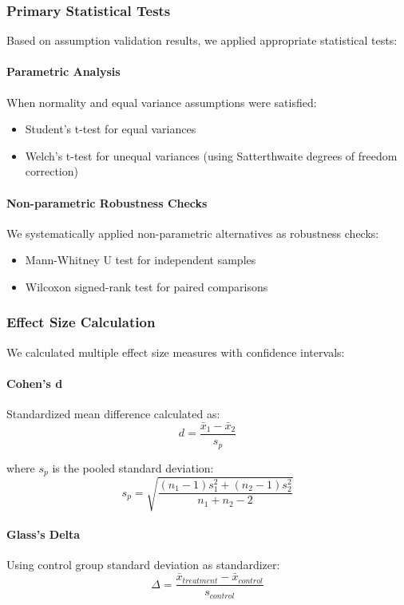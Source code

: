 \documentclass[conference]{IEEEtran}
\begin{document}
\subsubsection{Primary Statistical Tests}
Based on assumption validation results, we applied appropriate statistical tests:

\paragraph{Parametric Analysis}
When normality and equal variance assumptions were satisfied:
\begin{itemize}
    \item Student's t-test for equal variances
    \item Welch's t-test for unequal variances (using Satterthwaite degrees of freedom correction)
\end{itemize}

\paragraph{Non-parametric Robustness Checks}
We systematically applied non-parametric alternatives as robustness checks:
\begin{itemize}
    \item Mann-Whitney U test for independent samples
    \item Wilcoxon signed-rank test for paired comparisons
\end{itemize}

\subsubsection{Effect Size Calculation}
We calculated multiple effect size measures with confidence intervals:

\paragraph{Cohen's d}
Standardized mean difference calculated as:
\begin{equation}
d = \frac{\bar{x}_1 - \bar{x}_2}{s_p}
\end{equation}

where $s_p$ is the pooled standard deviation:
\begin{equation}
s_p = \sqrt{\frac{(n_1-1)s_1^2 + (n_2-1)s_2^2}{n_1 + n_2 - 2}}
\end{equation}

\paragraph{Glass's Delta}
Using control group standard deviation as standardizer:
\begin{equation}
\Delta = \frac{\bar{x}_{treatment} - \bar{x}_{control}}{s_{control}}
\end{equation}
\end{document}
